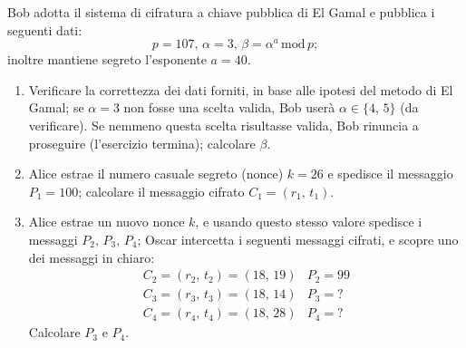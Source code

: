         Bob adotta il sistema di cifratura a chiave pubblica di El Gamal e pubblica i seguenti dati: \[
            p=107,\, \alpha=3,\, \beta= \alpha^{a} \,\mathrm{mod}\, p
        ;\] inoltre mantiene segreto l'esponente $a=40$.
        \begin{enumerate}
            \item Verificare la correttezza dei dati forniti, in base alle ipotesi del metodo di 
                El Gamal; se $\alpha=3$ non fosse una scelta valida, Bob userà $\alpha\in\{4,\,5\}$ 
                (da verificare). Se nemmeno questa scelta risultasse valida, Bob rinuncia a proseguire 
                (l'esercizio termina); calcolare $\beta$.
            \item Alice estrae il numero casuale segreto (nonce) $k=26$ e spedisce il messaggio $P_1=100$; 
                calcolare il messaggio cifrato $C_1=(r_1,\,t_1)$.
            \item Alice estrae un nuovo nonce $k$, e usando questo stesso valore spedisce i messaggi 
                $P_2,\,P_3,\,P_4$; Oscar intercetta i seguenti messaggi cifrati, e scopre uno dei messaggi 
                in chiaro: \[
                \begin{array}{ll}
                    C_2=(r_2,\,t_2)=(18,\,19) & P_2=99\\
                    C_3=(r_3,\,t_3)=(18,\,14) & P_3=?\\
                    C_4=(r_4,\,t_4)=(18,\,28) & P_4=?
                \end{array}
                \] Calcolare $P_3$ e $P_4$.
        \end{enumerate}

